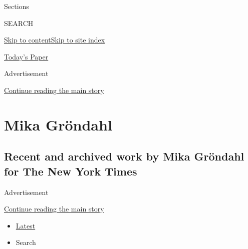 Sections

SEARCH

\protect\hyperlink{site-content}{Skip to
content}\protect\hyperlink{site-index}{Skip to site index}

\href{https://myaccount.nytimes.com/auth/login?response_type=cookie\&client_id=vi}{}

\href{https://www.nytimes.com/section/todayspaper}{Today's Paper}

Advertisement

\protect\hyperlink{after-top}{Continue reading the main story}

\hypertarget{mika-gruxf6ndahl}{%
\section{Mika Gröndahl}\label{mika-gruxf6ndahl}}

\hypertarget{recent-and-archived-work-by-mika-gruxf6ndahl-for-the-new-york-times}{%
\subsection{Recent and archived work by Mika Gröndahl for The New York
Times}\label{recent-and-archived-work-by-mika-gruxf6ndahl-for-the-new-york-times}}

Advertisement

\protect\hyperlink{after-mid1}{Continue reading the main story}

\begin{itemize}
\tightlist
\item
  \protect\hyperlink{stream-panel}{Latest}
\item
  Search
\end{itemize}

